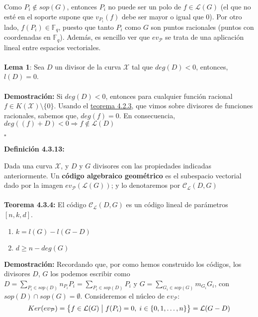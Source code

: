 \documentclass[11pt,spanish]{book}
\newcommand{\qed}{\begin{flushright} $\square$ \end{flushright}}
\begin{document}
Como $P_i\notin sop(G)$, entonces $P_i$ no puede ser un polo de $f\in\mathcal{L}(G)$ (el que no esté en el soporte supone que $v_{P_{i}}(f)$ debe ser mayor o igual que 0). Por otro lado, $f(P_i)\in \mathbb{F}_q$, puesto que tanto $P_i$ como $G$ son puntos racionales (puntos con coordenadas en $\mathbb{F}_q$). Además, es sencillo ver que $ev_{\mathcal{P}}$ se trata de una aplicación lineal entre espacios vectoriales. \\
\\ \hypertarget{lemaDivisores}{\textbf{Lema 1}}: Sea $D$ un divisor de la curva $\mathbf{\mathcal{X}}$ tal que $deg(D)<0$, entonces, $l(D)=0$.\\
\\\textbf{Demostración:} 
 Si $deg(D)<0$, entonces para cualquier función racional $f\in K(\mathbf{\mathcal{X}})\setminus\{ 0\}$. Usando el \hyperlink{teoremaDivisorFuncion}{teorema 4.2.3}, que vimos sobre divisores de funciones racionales, sabemos que, $deg(f)=0$. En consecuencia, $deg((f)+D)<0\Rightarrow f\notin \mathcal{L}(D)$
 \qed
\hypertarget{codigoAGdefinicion}{\textbf{Definición 4.3.13:}} Dada una curva $\mathbf{\mathcal{X}}$, y $D$ y $G$ divisores con las propiedades indicadas anteriormente. Un \textbf{código algebraico geométrico} es el subespacio vectorial dado por la imagen $ev_{\mathcal{P}}(\mathcal{L}(G))$; y lo denotaremos por  $\mathcal{C}_{\mathcal{L}}(D,G)$\\
\\ \hypertarget{teorema13.1.3}{\textbf{Teorema 4.3.4:}} El código $\mathcal{C}_{\mathcal{L}}(D,G)$ es un código lineal de parámetros $[n,k,d]$. 
\begin{enumerate}
    \item $k = l(G)-l(G-D)$
    \item $d\geq n - deg(G)$
\end{enumerate}
\textbf{Demostración:}
Recordando que, por como hemos construido los códigos, los divisores $D$, $G$ los podemos escribir como $D=\sum_{P_i\in sop(D)}n_{P_i}P_i=\sum_{P_i\in sop(D)}P_i$ y $G=\sum_{G_i\in sop(G)}m_{G_i}G_i$, con $sop(D)\cap sop(G)=\emptyset$. Consideremos el núcleo de $ev_{\mathcal{P}}:$
$$Ker(ev_{\mathcal{P}})=\big{\{}f\in\mathcal{L}(G)\;\big{|}\;f(P_i)=0,\;i\in\{0,1,\ldots,n\}\big{\}}=\mathcal{L}(G-D)$$
\end{document}
